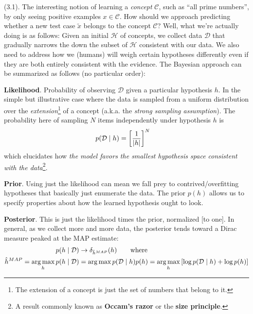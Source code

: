 \documentclass[11pt]{article}
\begin{document}
\p {} (3.1). The interesting notion of learning a \textit{concept} $\mathcal C$, such as ``all prime numbers'', by only seeing positive examples $x \in \mathcal C$. How should we approach predicting whether a new test case $\widetilde x$ belongs to the concept $\mathcal C$? Well, what we're actually doing is as follows: Given an initial  $\mathcal H$ of concepts, we collect data $\mathcal D$ that gradually narrows the down the subset of $\mathcal H$ consistent with our data. We also need to address how we (humans) will weigh certain hypotheses differently even if they are both entirely consistent with the evidence. The Bayesian approach can be summarized as follows (no particular order):
\begin{compactitem}
	\item \textbf{Likelihood}. Probability of observing $\mathcal D$ given a particular hypothesis $h$. In the simple but illustrative case where the data is sampled from a uniform distribution over the \textit{extension}\footnote{The extension of a concept is just the set of numbers that belong to it.} of a concept (a.k.a. the \textit{strong sampling assumption}). The probability here of sampling $N$ items independently under hypothesis $h$ is 
	\begin{align}
		p(\mathcal D \mid h) 
			&= \left[  \frac{1}{|h|} \right]^N
	\end{align}
	which elucidates how \textit{the model favors the smallest hypothesis space consistent with the data}\footnote{A result commonly known as \textbf{Occam's razor} or the \textbf{size principle}.}.
	
	\item \textbf{Prior}. Using just the likelihood can mean we fall prey to contrived/overfitting hypotheses that basically just enumerate the data. The prior $p(h)$ allows us to specify properties about how the learned hypothesis ought to look. 
	
	\item \textbf{Posterior}. This is just the likelihood times the prior, normalized [to one]. In general, as we collect more and more data, the posterior tends toward a Dirac measure peaked at the MAP estimate:
	\begin{align}
		p(h \mid \mathcal D) &\rightarrow \delta_{\hat h^{MAP}} (h) \qquad \text{where} \\
		\hat h^{MAP} 
			= \operatorname*{arg\,max}_h p(h \mid \mathcal D) &= \operatorname*{arg\,max} p(\mathcal D \mid h) p(h)
			= \operatorname*{arg\,max}_h \left[ 
					\log p(\mathcal D \mid h) + \log p(h)
				\right]
	\end{align}
\end{compactitem}
\end{document}
